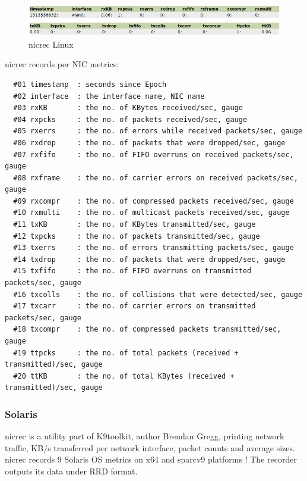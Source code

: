 \begin{figure}[!ht]
\centering
\includegraphics[scale=0.62]{nicrec_lin.png}
\caption{nicrec Linux}
\label{fig:nicrec_lin}
\end{figure}

\noindent
nicrec records per NIC metrics: 

\begin{verbatim}
  #01 timestamp  : seconds since Epoch
  #02 interface  : the interface name, NIC name
  #03 rxKB       : the no. of KBytes received/sec, gauge
  #04 rxpcks     : the no. of packets received/sec, gauge
  #05 rxerrs     : the no. of errors while received packets/sec, gauge
  #06 rxdrop     : the no. of packets that were dropped/sec, gauge
  #07 rxfifo     : the no. of FIFO overruns on received packets/sec, gauge
  #08 rxframe    : the no. of carrier errors on received packets/sec, gauge
  #09 rxcompr    : the no. of compressed packets received/sec, gauge
  #10 rxmulti    : the no. of multicast packets received/sec, gauge
  #11 txKB       : the no. of KBytes transmitted/sec, gauge
  #12 txpcks     : the no. of packets transmitted/sec, gauge
  #13 txerrs     : the no. of errors transmitting packets/sec, gauge
  #14 txdrop     : the no. of packets that were dropped/sec, gauge
  #15 txfifo     : the no. of FIFO overruns on transmitted packets/sec, gauge
  #16 txcolls    : the no. of collisions that were detected/sec, gauge
  #17 txcarr     : the no. of carrier errors on transmitted packets/sec, gauge
  #18 txcompr    : the no. of compressed packets transmitted/sec, gauge
  #19 ttpcks     : the no. of total packets (received + transmitted)/sec, gauge
  #20 ttKB       : the no. of total KBytes (received + transmitted)/sec, gauge
\end{verbatim}


\subsubsection{Solaris}
nicrec is a utility part of K9toolkit, author Brendan Gregg, printing network
traffic, KB/s transferred per network interface, packet counts and average
sizes. nicrec records 9 Solaris OS metrics on x64 and sparcv9 platforms ! 
The recorder outputs its data under RRD format.

